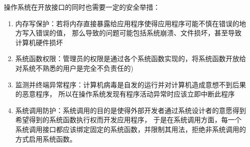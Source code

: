 操作系统在开放接口的同时也需要一定的安全举措：
\begin{enumerate}
    \item 内存写保护：若将内存直接暴露给应用程序使得应用程序可能不慎在错误的地方写入错误的值，
    那么导致的问题可能包括系统崩溃、文件损坏，甚至导致计算机硬件损坏
    \item 系统函数权限：管理员的权限是通过各个系统函数实现的，将系统函数开放给对系统不熟悉的用户是完全不负责任的)
    \item 监测并终端异常程序：计算机病毒是自发的运行并对计算机造成意想不到后果的恶意程序，
    所以在操作系统发现有程序活动异常时应该立即中断此程序
    \item 系统调用防护：系统调用的目的是使得外部开发者通过系统设计者的意愿得到希望得到的系统函数执行权而开发应用程序，
    于是在系统调用方面，每一个系统调用接口都应该绑定固定的系统函数，并限制其用法，拒绝非系统调用的方式启用系统函数。
\end{enumerate}